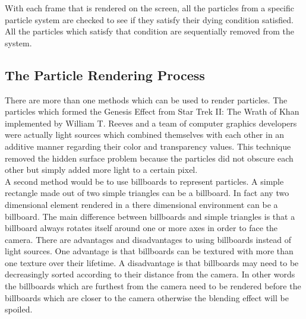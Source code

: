 With each frame that is rendered on the screen, all the particles from a specific particle system are checked to see if they satisfy their dying condition satisfied. All the particles which satisfy that condition are sequentially removed from the system.

\newpage
\subsection{The Particle Rendering Process}
There are more than one methods which can be used to render particles. The particles which formed the Genesis Effect from Star Trek II: The Wrath of Khan implemented by William T. Reeves and a team of computer graphics developers were actually light sources which combined themselves with each other in an additive manner regarding their color and transparency values. This technique removed the hidden surface problem because the particles did not obscure each other but simply added more light to a certain pixel.\\

A second method would be to use billboards to represent particles. A simple rectangle made out of two simple triangles can be a billboard. In fact any two dimensional element rendered in a there dimensional environment can be a billboard. The main difference between billboards and simple triangles is that a billboard always rotates itself around one or more axes in order to face the camera. There are advantages and disadvantages to using billboards instead of light sources. One advantage is that billboards can be textured with more than one texture over their lifetime. A disadvantage is that billboards may need to be decreasingly sorted according to their distance from the camera. In other words the billboards which are furthest from the camera need to be rendered before the billboards which are closer to the camera otherwise the blending effect will be spoiled.\\